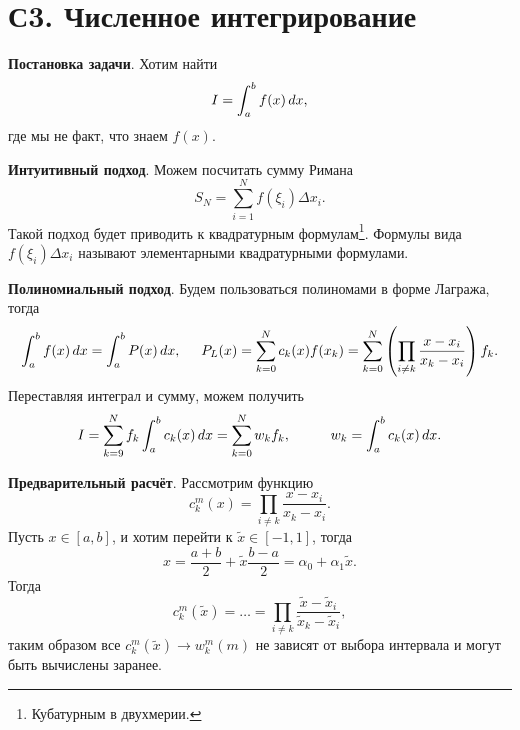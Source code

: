 \section{С3. Численное интегрирование}


\textbf{Постановка задачи}. Хотим найти
\begin{equation*}
	I = \int_{a}^{b} f(x) \, d x,
\end{equation*}
где мы не факт, что знаем $f(x)$. 


\textbf{Интуитивный подход}. Можем посчитать сумму Римана
\begin{equation*}
	S_N = \sum_{i=1}^{N} f(\xi_i) \Delta x_i.
\end{equation*}
Такой подход будет приводить к квадратурным формулам\footnote{
	Кубатурным в двухмерии. 
}. Формулы вида $f(\xi_i) \Delta x_i$ называют элементарными квадратурными формулами.


\textbf{Полиномиальный подход}. Будем пользоваться полиномами в форме Лагража, тогда
\begin{equation*}
	\int_{a}^{b} f(x) \, d x = \int_{a}^{b} P(x) \, d x,
	\hspace{5 mm} 
	P_L(x) = \sum_{k=0}^{N} c_k (x) f(x_k) = \sum_{k=0}^{N} \left(
		\prod_{i\neq k} \frac{x-x_i}{x_k-x_i}
	\right) f_k. 
\end{equation*}
Переставляя интеграл и сумму, можем получить
\begin{equation*}
	I = \sum_{k=9}^{N} f_k \int_{a}^{b} c_k (x) \d x = \sum_{k=0}^{N} w_k f_k,
	\hspace{10 mm} 
	w_k = \int_{a}^{b} c_k(x) \d x.
\end{equation*}

\textbf{Предварительный расчёт}. Рассмотрим функцию
\begin{equation*}
	c^m_k (x) = \prod_{i\neq k} \frac{x-x_i}{x_k-x_i}.
\end{equation*}
Пусть $x \in [a, b]$, и хотим перейти к $\tilde{x} \in [-1, 1]$, тогда
\begin{equation*}
	x = \frac{a+ b}{2} + \tilde{x} \frac{b-a}{2} = \alpha_0 + \alpha_1 \tilde{x}.
\end{equation*}
Тогда
\begin{equation*}
	c_k^m (\tilde{x}) = \ldots = \prod_{i\neq k} \frac{\tilde{x}-\tilde{x}_i}{\tilde{x}_k-\tilde{x}_i},
\end{equation*}
таким образом все $c_k^m (\tilde{x}) \to w_k^m (m)$ не зависят от выбора интервала и могут быть вычислены заранее. 

